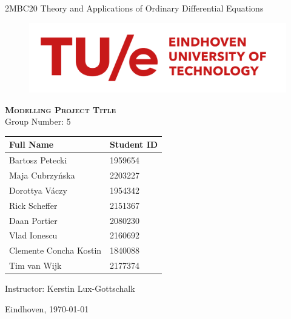 \begin{titlepage}
\begin{center}
{\Large 2MBC20 Theory and Applications of Ordinary Differential Equations}\\

\bigskip

\begin{figure} [h]
\includegraphics[width=0.6\linewidth]{Figures/tuelogo.png}
\centering
\end{figure}


\bigskip

{\bf \textsc{\huge Modelling Project Title}}\\[8mm]

{\LARGE Group Number: 5}\\[8mm]

\vspace{5mm}


\begin{table}[H]
\centering
\large
\begin{tabu} to 0.6\linewidth {X[l] X[r]}
Full Name & Student ID\\
\hline
Bartosz Petecki & 1959654 \\
Maja Cubrzyńska & 2203227 \\
Dorottya Váczy & 1954342 \\
Rick Scheffer & 2151367 \\
Daan Portier & 2080230 \\
Vlad Ionescu & 2160692 \\
Clemente Concha Kostin & 1840088 \\
Tim van Wijk & 2177374 \\
\end{tabu}

\end{table}

\vspace{7mm}
{\large Instructor: Kerstin Lux-Gottschalk}

\mbox{}
\vfill
\large Eindhoven, \today \\
\end{center}
\end{titlepage}